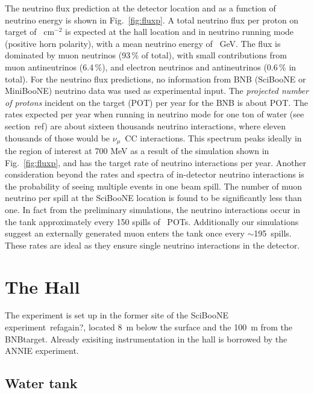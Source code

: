 The neutrino flux prediction at the detector location and as a function %
of neutrino energy is shown in Fig.~\ref{fig:fluxp}.
A total neutrino flux per proton on target of ~cm$^{-2}$ is expected at the %
hall location and in neutrino running mode (positive horn polarity), with %
a mean neutrino energy of ~GeV. 
The flux is dominated by muon neutrinos (93\,\% of total), with small contributions from %
muon antineutrinos (6.4\,\%), and electron neutrinos and antineutrinos (0.6\,\% in total). 
For the neutrino flux predictions, no information from BNB %
(SciBooNE or MiniBooNE) neutrino data was used as experimental input.
The \emph{projected number of protons} incident on the target (POT) per year for the BNB %
is about  POT.
The rates expected per year when running in neutrino mode for one ton of water %
(see section~ref) are about sixteen thousands neutrino interactions, %
where eleven thousands of those would be $\nu_\mu$~CC interactions. 
This spectrum peaks ideally in the region of interest at 700 MeV as a result of the simulation %
shown in Fig.~\ref{fig:fluxp}, and has the target rate of neutrino interactions per year.
Another consideration beyond the rates and spectra of in-detector neutrino interactions %
is the probability of seeing multiple events in one beam spill. 
The number of muon neutrino per spill at the SciBooNE location is found to be significantly %
less than one.
In fact from the preliminary simulations, the neutrino interactions occur%
in the tank approximately every 150 spills of ~POTs. 
Additionally our simulations suggest an externally generated muon enters the tank once %
every $\sim$195~spills. 
These rates are ideal as they ensure single neutrino interactions in the detector.

\section{The Hall}

The experiment is set up in the former site of the SciBooNE experiment~refagain?, %
located 8~m below the surface and the 100~m from the BNBtarget.
Already exisiting instrumentation in the hall is borrowed by the ANNIE experiment.

\subsection{Water tank}

